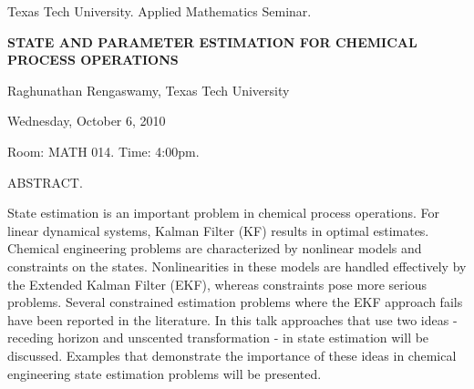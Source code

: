\documentclass[oneside]{amsart}
\newcommand{\talktitle}{State and Parameter Estimation for Chemical Process Operations }
\newcommand{\talkspeaker}{Raghunathan Rengaswamy, Texas Tech University}
\newcommand{\talkdate}{Wednesday, October 6, 2010}
\newcommand{\talkabstract}{
State estimation is an important problem in chemical process operations. For linear dynamical systems, Kalman Filter (KF) results in optimal estimates. Chemical engineering problems are characterized by nonlinear models and constraints on the states. Nonlinearities in these models are handled effectively by the Extended Kalman Filter (EKF), whereas constraints pose more serious problems. Several constrained estimation problems where the EKF approach fails have been reported in the literature. In this talk approaches that use two ideas - receding horizon and unscented transformation - in state estimation will be discussed. Examples that demonstrate the importance of these ideas in chemical engineering state estimation problems will be presented.
}
\begin{document}
\thispagestyle{empty}

\begin{center}
Texas Tech University.  Applied Mathematics Seminar.

\end{center}

\begin{center}

\textbf{\LARGE {\uppercase{\talktitle}} }

\talkspeaker

\talkdate

Room: MATH 014.  Time: 4:00pm.

\end{center}

ABSTRACT.
\talkabstract
\end{document}
